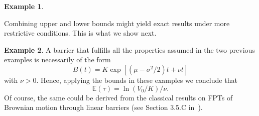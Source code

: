 \documentclass[12pt]{article}
\theoremstyle{definition}
\newtheorem{example}{Example}[theorem]
\begin{document}
\begin{example}

\end{example}

Combining upper and lower bounds might yield exact results under more restrictive conditions. This is what we show next.

\begin{example}
A barrier that fulfills all the properties assumed in the two previous examples is necessarily of the form
$$
B(t)=K\exp\left[(\mu-\sigma^2/2)t+ \nu t \right]
$$
with $\nu >0$. Hence, applying the bounds in these examples we conclude that
$$
\mathbb{E}(\tau) = \ln\left( V_0/K \right)/\nu.
$$
Of course, the same could be derived from the classical results on FPTs of Brownian motion through linear barriers (see Section 3.5.C in~\cite{karatzas1991brownian}).
\end{example}
\end{document}
